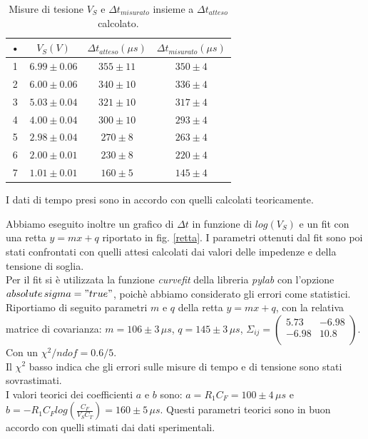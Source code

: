 \documentclass[10pt,a4paper]{article}
\begin{document}
\begin{table}[!ht]
\centering
\begin{tabular}{|c|c|c|c|}
\hline 
• & $V_{S} (V)$ & $\Delta t _ {atteso} (\mu s)$ & $\Delta t _ {misurato} (\mu s)$ \\ 
\hline
1 & $6.99 \pm 0.06$ & $355 \pm 11$ & $350 \pm 4$ \\
2 & $6.00 \pm 0.06$ & $340 \pm 10$ & $336 \pm 4$ \\  
3 & $5.03 \pm 0.04$ & $321 \pm 10$ & $317 \pm 4$ \\  
4 & $4.00 \pm 0.04$ & $300 \pm 10$ & $293 \pm 4$ \\ 
5 & $2.98 \pm 0.04$ & $270 \pm 8$ & $263 \pm 4$ \\ 
6 & $2.00 \pm 0.01$ & $230 \pm 8$ & $220 \pm 4$ \\ 
7 & $1.01 \pm 0.01$ & $160 \pm 5$ & $145 \pm 4$ \\   
\hline
\end{tabular} 
\caption{Misure di tesione $V_S$ e $\Delta t _ {misurato}$ insieme a $\Delta t _ {atteso}$ calcolato.}
\label{dati}
\end{table}

I dati di tempo presi sono in accordo con quelli calcolati teoricamente.

Abbiamo eseguito inoltre un grafico di $\Delta t$ in funzione di $log(V_{S})$ e un fit con una retta $y = mx + q$ riportato in fig. \ref{retta}. I parametri ottenuti dal fit sono poi stati confrontati con quelli attesi calcolati dai valori delle impedenze e della tensione di soglia.\\
Per il fit si è utilizzata la funzione \emph{curvefit} della libreria \emph{pylab} con l'opzione \emph{$absolute\,sigma = "true"$}, poichè abbiamo considerato gli errori come statistici. Riportiamo di seguito parametri $m$ e $q$ della retta $y=mx+q$, con la relativa matrice di covarianza: $m = 106 \pm 3 \, \mu s $, $q = 145\pm 3 \, \mu s$,  $ \Sigma_{ij} = \left( \begin{array}{cc}
5.73 & -6.98 \\ 
-6.98 & 10.8\\
\end{array} \right)$. Con un $\chi^2/ndof = 0.6/5$.\\

Il $\chi^2$ basso indica che gli errori sulle misure di tempo e di tensione sono stati sovrastimati.\\

I valori teorici dei coefficienti $a$ e $b$ sono: $a = R_1 C_F = 100 \pm 4 \, \mu s$ e $b = - R_1 C_F log \left( \frac{C_F}{V_S C_T}\right) = 160 \pm 5 \, \mu s$. Questi parametri teorici sono in buon accordo con quelli stimati dai dati sperimentali.\\
\end{document}
